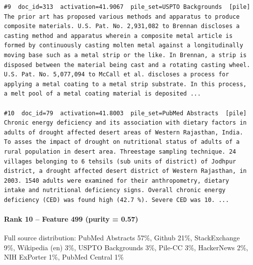 \begin{verbatim}
#9  doc_id=313  activation=41.9067  pile_set=USPTO Backgrounds  [pile]
The prior art has proposed various methods and apparatus to produce composite materials. U.S. Pat. No. 2,931,082 to Brennan discloses a casting method and apparatus wherein a composite metal article is formed by continuously casting molten metal against a longitudinally moving base such as a metal strip or the like. In Brennan, a strip is disposed between the material being cast and a rotating casting wheel.
U.S. Pat. No. 5,077,094 to McCall et al. discloses a process for applying a metal coating to a metal strip substrate. In this process, a melt pool of a metal coating material is deposited ...

#10  doc_id=79  activation=41.8003  pile_set=PubMed Abstracts  [pile]
Chronic energy deficiency and its association with dietary factors in adults of drought affected desert areas of Western Rajasthan, India.
To asses the impact of drought on nutritional status of adults of a rural population in desert area. Threestage sampling technique. 24 villages belonging to 6 tehsils (sub units of district) of Jodhpur district, a drought affected desert district of Western Rajasthan, in 2003. 1540 adults were examined for their anthropometry, dietary intake and nutritional deficiency signs. Overall chronic energy deficiency (CED) was found high (42.7 %). Severe CED was 10. ...

\end{verbatim}

\paragraph*{Rank 10 -- Feature 499 (purity = 0.57)}

Full source distribution: PubMed Abstracts 57\%, Github 21\%, StackExchange 9\%, Wikipedia (en) 3\%, USPTO Backgrounds 3\%, Pile-CC 3\%, HackerNews 2\%, NIH ExPorter 1\%, PubMed Central 1\%

